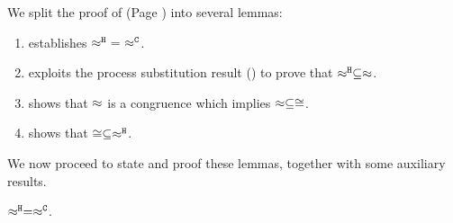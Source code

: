 \noi We split the proof of  (Page \pageref{the:coincidence}) into 
several lemmas:
\begin{enumerate}[$-$]
\item	{} establishes $\hwb\ =\ \fwb$.
\item	{} exploits the process substitution result
		() to prove that $\approx^\mathtt{H} \subseteq \approx$.
\item	{} shows that $\approx$ is a congruence
		which implies $\approx \subseteq \cong$.
\item	{} shows  that $\cong \subseteq \approx^\mathtt{H}$.
\end{enumerate}


\noi
We now proceed to state and proof these lemmas, together with some auxiliary results.



\begin{lemma}
	\label{app:lem:wb_eq_wbf}
	$\approx^\mathtt{H} = \approx^\mathtt{C}$.
\end{lemma}

